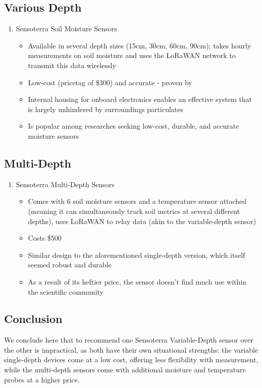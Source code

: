 \documentclass{article}
\begin{document}
\subsection{Various Depth}  
\begin{enumerate}
\item Sensoterra Soil Moisture Sensors
\begin{itemize}
    \item Available in several depth sizes (15cm, 30cm, 60cm, 90cm); takes hourly measurements on soil moisture and uses the LoRaWAN network to transmit this data wirelessly
    \item Low-cost (pricetag of \$300) and accurate - proven by
    \item Internal housing for onboard electronics enables an effective system that is largely unhindered by surroundings particulates
    \item Is popular among researches seeking low-cost, durable, and accurate moisture sensors
\end{itemize}
\end{enumerate}

\subsection{Multi-Depth}
\begin{enumerate}
\item Sensoterra Multi-Depth Sensors
\begin{itemize}
    \item Comes with 6 soil moisture sensors and a temperature sensor attached (meaning it can simultaneously track soil metrics at several different depths), uses LoRaWAN to relay data (akin to the variable-depth sensor)
    \item Costs \$500
    \item Similar design to the aforementioned single-depth version, which itself seemed robust and durable
    \item As a result of its heftier price, the sensor doesn't find much use within the scientific community
\end{itemize}
\end{enumerate}

\subsection{Conclusion}
We conclude here that to recommend one Sensoterra Variable-Depth sensor over the other is impractical, as both have their own situational strengths: the variable single-depth devices come at a low cost, offering less flexibility with measurement, while the multi-depth sensors come with additional moisture and temperature probes at a higher price.
\end{document}
